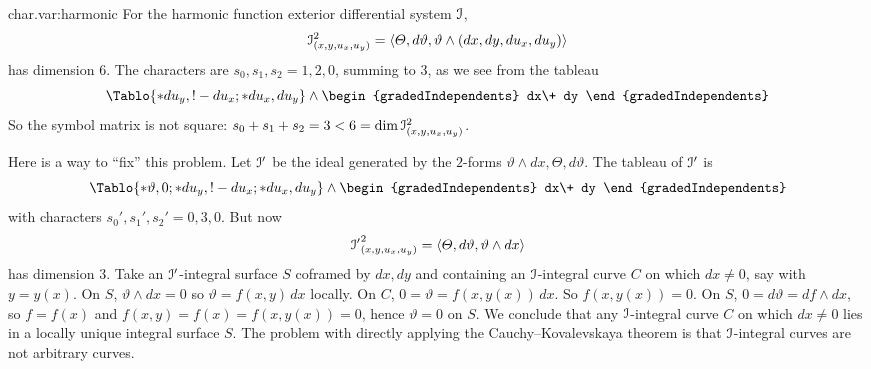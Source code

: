 \begin{answer}{char.var:harmonic}
For the harmonic function exterior differential system \(\mathcal{I}\),
\[
\mathcal{I}^2_{(x,y,u_x,u_y)}
=
\left<\Theta,d\vartheta,\vartheta\wedge(dx,dy,du_x,du_y)\right>
\]
has dimension 6.
The characters are \(s_0,s_1,s_2=1,2,0\), summing to \(3\), as we see from the tableau
\[
\Tablo{*du_y,!-du_x;*du_x,du_y}
\wedge
\begin{gradedIndependents}
dx\+
dy
\end{gradedIndependents}
\]
So the symbol matrix is not square: \(s_0+s_1+s_2=3<6=\dim\mathcal{I}^2_{(x,y,u_x,u_y)}\).

Here is a way to ``fix'' this problem.
Let \(\mathcal{I}'\) be the ideal generated by the \(2\)-forms \(\vartheta\wedge dx,\Theta,d\vartheta\).
The tableau of \(\mathcal{I}'\) is
\[
\Tablo{
*\vartheta,0;*du_y,!-du_x;*du_x,du_y}
\wedge
\begin{gradedIndependents}
dx\+
dy
\end{gradedIndependents}
\]
with characters \(s_0',s_1',s_2'=0,3,0\).
But now 
\[
{\mathcal{I}'}^2_{(x,y,u_x,u_y)}
=
\left<\Theta,d\vartheta,\vartheta\wedge dx\right>
\]
has dimension \(3\).
Take an \(\mathcal{I}'\)-integral surface \(S\) coframed by \(dx,dy\) and containing an \(\mathcal{I}\)-integral curve \(C\) on which \(dx\ne 0\), say with \(y=y(x)\).
On \(S\), \(\vartheta\wedge dx=0\) so \(\vartheta=f(x,y)\,dx\) locally.
On \(C\), \(0=\vartheta=f(x,y(x))\,dx\).
So \(f(x,y(x))=0\).
On \(S\), \(0=d\vartheta=df\wedge dx\), so \(f=f(x)\) and \(f(x,y)=f(x)=f(x,y(x))=0\), hence \(\vartheta=0\) on \(S\).
We conclude that any \(\mathcal{I}\)-integral curve \(C\) on which \(dx\ne 0\) lies in a locally unique integral surface \(S\).
The problem with directly applying the Cauchy--Kovalevskaya theorem is that \(\mathcal{I}\)-integral curves are not arbitrary curves.
\end{answer}
